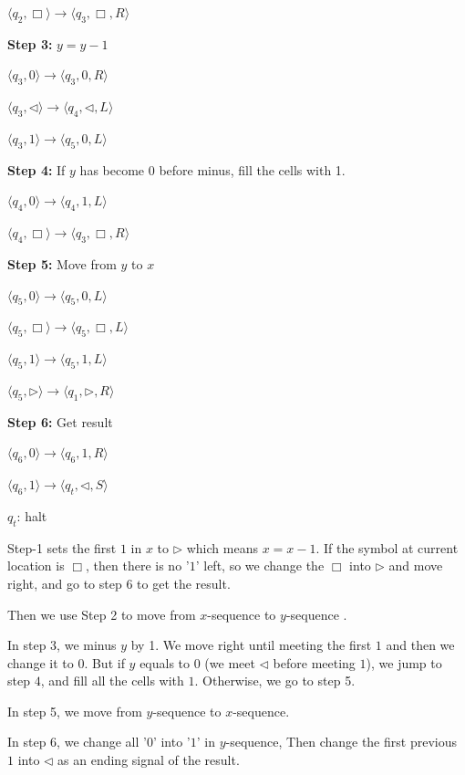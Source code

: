 \documentclass[12pt,a4paper]{article}
\theoremstyle{definition}
\begin{document}
\begin{enumerate}
\begin{enumerate}
			$\langle q_2,\Box\rangle\rightarrow\langle q_3,\Box,R\rangle$
			
			\textbf{Step 3: }$y=y-1$
			
			$\langle q_3,0\rangle\rightarrow\langle q_3,0,R\rangle$
			
			$\langle q_3,\triangleleft\rangle\rightarrow\langle q_4,\triangleleft,L\rangle$
			
			$\langle q_3,1\rangle\rightarrow\langle q_5,0,L\rangle$
			
			\textbf{Step 4:} If $y$ has become 0 before minus, fill the cells with 1. 
			
			$\langle q_4,0\rangle\rightarrow\langle q_4,1,L\rangle$
			
			$\langle q_4,\Box\rangle\rightarrow\langle q_3,\Box,R\rangle$
			
			\textbf{Step 5:} Move from $y$ to $x$
			
			$\langle q_5,0\rangle\rightarrow\langle q_5,0,L\rangle$
			
			$\langle q_5,\Box\rangle\rightarrow\langle q_5,\Box,L\rangle$
			
			$\langle q_5,1\rangle\rightarrow\langle q_5,1,L\rangle$
			
			$\langle q_5,\triangleright\rangle\rightarrow\langle q_1,\triangleright,R\rangle$
			
			\textbf{Step 6: }Get result
			
			$\langle q_6,0\rangle\rightarrow\langle q_6,1,R\rangle$
			
			$\langle q_6,1\rangle\rightarrow\langle q_t,\triangleleft,S\rangle$
			
			$q_t$: halt
			
			\quad\par
			Step-1  sets the first $1$ in $x$ to $\triangleright$ which means $x=x-1$. If the symbol at current location is $\Box$, then there is no '$1$' left, so we change the $\Box$ into $\triangleright$ and move right, and go to step 6 to get the result.
			
			Then we use Step 2 to move from $x$-sequence to $y$-sequence .
			
			In step 3, we minus $y$ by 1. We move right until meeting the first $1$ and then we change it to $0$. But if  $y$ equals to $0$ (we meet $\triangleleft$ before meeting  $1$), we jump to step $4$, and fill all the cells with $1$. Otherwise, we go to step 5.
			
			In step 5, we move from $y$-sequence to $x$-sequence.
			
			In step 6, we change all '$0$' into '$1$' in $y$-sequence,  Then change the first previous $1$ into $\triangleleft$ as an ending signal of the result.
			

\end{enumerate}
\end{enumerate}
\end{document}
